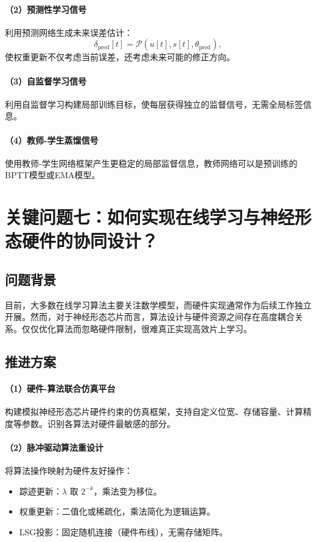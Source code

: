 \documentclass[journal,12pt,onecolumn]{IEEEtran}
\begin{document}
\paragraph{（2）预测性学习信号}
利用预测网络生成未来误差估计：
\[
\delta_{\text{pred}}[t] = \mathcal{P}\left(u[t], s[t], \theta_{\text{pred}}\right),
\]
使权重更新不仅考虑当前误差，还考虑未来可能的修正方向。

\paragraph{（3）自监督学习信号}
利用自监督学习构建局部训练目标，使每层获得独立的监督信号，无需全局标签信息。

\paragraph{（4）教师-学生蒸馏信号}
使用教师-学生网络框架产生更稳定的局部监督信息，教师网络可以是预训练的BPTT模型或EMA模型。

\section{关键问题七：如何实现在线学习与神经形态硬件的协同设计？}

\subsection{问题背景}

目前，大多数在线学习算法主要关注数学模型，而硬件实现通常作为后续工作独立开展。然而，对于神经形态芯片而言，算法设计与硬件资源之间存在高度耦合关系。仅仅优化算法而忽略硬件限制，很难真正实现高效片上学习。

\subsection{推进方案}

\paragraph{（1）硬件-算法联合仿真平台}
构建模拟神经形态芯片硬件约束的仿真框架，支持自定义位宽、存储容量、计算精度等参数。识别各算法对硬件最敏感的部分。

\paragraph{（2）脉冲驱动算法重设计}
将算法操作映射为硬件友好操作：
\begin{itemize}
    \item 踪迹更新：\(\lambda\) 取 \(2^{-k}\)，乘法变为移位。
    \item 权重更新：二值化或稀疏化，乘法简化为逻辑运算。
    \item LSG投影：固定随机连接（硬件布线），无需存储矩阵。
\end{itemize}
\end{document}
